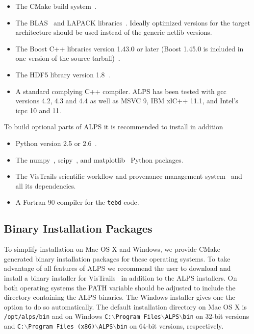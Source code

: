 \documentclass[12pt]{iopart}
\begin{document}
\begin{itemize}
\item The CMake build system~\cite{cmake}.
\item The BLAS~\cite{blasnetlib} and LAPACK libraries~\cite{lapack}. Ideally optimized versions for the target architecture should be used instead of the generic netlib versions.
\item The Boost C++ libraries version 1.43.0 or later (Boost 1.45.0 is included in one version of the source tarball)~\cite{boost}.
\item The HDF5 library version 1.8~\cite{hdf5}.
\item A standard complying C++ compiler. ALPS has been tested with gcc versions 4.2, 4.3 and 4.4 as well as MSVC 9, IBM xlC++ 11.1, and Intel's icpc 10 and 11.
\end{itemize}
To build optional parts of ALPS it is recommended to install in addition
\begin{itemize}
\item Python version 2.5 or 2.6~\cite{python}.
\item The numpy~\cite{numpy}, scipy~\cite{scipy}, and matplotlib~\cite{matplotlib} Python packages.
\item The VisTrails scientific workflow and provenance management system~\cite{vistrails} and all its dependencies.
\item A Fortran 90 compiler for the {\tt tebd} code.
\end{itemize}

\subsection{Binary Installation Packages}

To simplify installation on Mac OS X and Windows, we provide CMake-generated binary installation packages for these operating systems. To take advantage of all features of ALPS we recommend the user to download and install a binary installer for VisTrails~\cite{vistrails} in addition to the ALPS installers. On both operating systems the PATH variable should be adjusted to include the directory containing the ALPS binaries. The Windows installer gives one the option to do so automatically. The default installation directory on Mac OS X is {\tt /opt/alps/bin} and on Windows {\tt C:$\backslash$Program Files$\backslash$ALPS$\backslash$bin} on 32-bit versions and  {\tt C:$\backslash$Program Files (x86)$\backslash$ALPS$\backslash$bin} on 64-bit versions, respectively.
\end{document}
